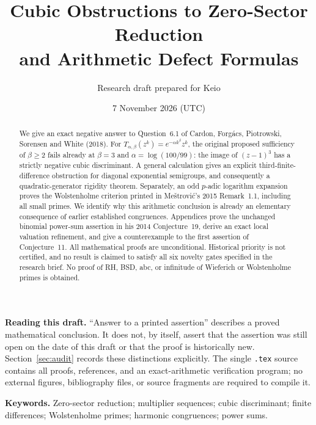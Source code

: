 \documentclass[11pt,a4paper]{article}
\title{\LARGE\bfseries\color{ink}Cubic Obstructions to Zero-Sector Reduction\\[5pt]
\Large and Arithmetic Defect Formulas}
\author{\normalsize Research draft prepared for Keio}
\date{\normalsize 7 November 2026 (UTC)}
\theoremstyle{definition}
\theoremstyle{remark}
\begin{document}
\maketitle
\begin{abstract}
We give an exact negative answer to Question~6.1 of Cardon, Forg\'acs,
Piotrowski, Sorensen and White (2018).  For
$T_{\alpha,\beta}(z^k)=e^{-\alpha k^\beta}z^k$, the original proposed
sufficiency of $\beta\ge2$ fails already at $\beta=3$ and
$\alpha=\log(100/99)$: the image of $(z-1)^3$ has a strictly negative
cubic discriminant.  A general calculation gives an explicit
third-finite-difference obstruction for diagonal exponential semigroups,
and consequently a quadratic-generator rigidity theorem.  Separately,
an odd $p$-adic logarithm expansion proves the Wolstenholme criterion
printed in Me\v{s}trovi\'c's 2015 Remark~1.1, including all small primes.
We identify why this arithmetic conclusion is already an elementary
consequence of earlier established congruences.  Appendices prove the
unchanged binomial power-sum assertion in his 2014 Conjecture~19, derive
an exact local valuation refinement, and give a counterexample to the
first assertion of Conjecture~11.  All mathematical proofs are
unconditional.  Historical priority is not certified, and no result is
claimed to satisfy all six novelty gates specified in the research
brief.  No proof of RH, BSD, abc, or infinitude of Wieferich or
Wolstenholme primes is obtained.
\end{abstract}

\begin{center}
\begin{minipage}{0.92\textwidth}
\small\textbf{Reading this draft.}
``Answer to a printed assertion'' describes a proved mathematical
conclusion.  It does not, by itself, assert that the assertion was still
open on the date of this draft or that the proof is historically new.
Section~\ref{sec:audit} records these distinctions explicitly.  The
single \texttt{.tex} source contains all proofs, references, and an
exact-arithmetic verification program; no external figures, bibliography
files, or source fragments are required to compile it.
\end{minipage}
\end{center}
\vspace{4pt}
\noindent\textbf{Keywords.} Zero-sector reduction; multiplier sequences;
cubic discriminant; finite differences; Wolstenholme primes;
harmonic congruences; power sums.

\clearpage
\tableofcontents
\clearpage
\end{document}
